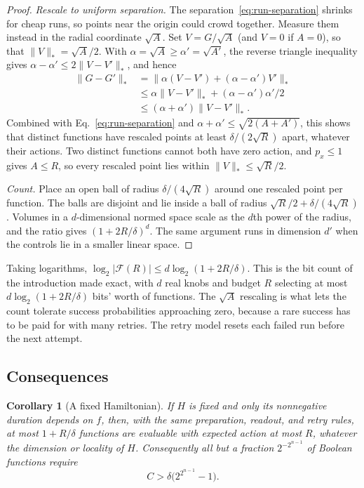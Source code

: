 \documentclass[11pt,a4paper]{article}
\newtheorem{corollary}[theorem]{Corollary}
\newcommand{\norm}[1]{\lVert #1\rVert}
\begin{document}
\begin{proof}
\emph{Rescale to uniform separation.} The separation~\eqref{eq:run-separation} shrinks for cheap runs, so points near the origin could crowd together. Measure them instead in the radial coordinate $\sqrt A$. Set $V=G/\sqrt A$ (and $V=0$ if $A=0$), so that $\norm V_*=\sqrt A/2$. With $\alpha=\sqrt A\ge\alpha'=\sqrt{A'}$, the reverse triangle inequality gives $\alpha-\alpha'\le2\norm{V-V'}_*$, and hence
\begin{equation}
 \begin{aligned}
 \norm{G-G'}_*&=\norm{\alpha(V-V')+(\alpha-\alpha')V'}_*\\
 &\le\alpha\norm{V-V'}_*+(\alpha-\alpha')\alpha'/2\\
 &\le(\alpha+\alpha')\norm{V-V'}_*.
 \end{aligned}
\end{equation}
Combined with Eq.~\eqref{eq:run-separation} and $\alpha+\alpha'\le\sqrt{2(A+A')}$, this shows that distinct functions have rescaled points at least $\delta/(2\sqrt R)$ apart, whatever their actions. Two distinct functions cannot both have zero action, and $p_x\le1$ gives $A\le R$, so every rescaled point lies within $\norm V_*\le\sqrt R/2$.

\emph{Count.} Place an open ball of radius $\delta/(4\sqrt R)$ around one rescaled point per function. The balls are disjoint and lie inside a ball of radius $\sqrt R/2+\delta/(4\sqrt R)$. Volumes in a $d$-dimensional normed space scale as the $d$th power of the radius, and the ratio gives $(1+2R/\delta)^d$. The same argument runs in dimension $d'$ when the controls lie in a smaller linear space.
\end{proof}

Taking logarithms, $\log_2|\mathcal F(R)|\le d\log_2(1+2R/\delta)$. This is the bit count of the introduction made exact, with $d$ real knobs and budget $R$ selecting at most $d\log_2(1+2R/\delta)$ bits' worth of functions. The $\sqrt A$ rescaling is what lets the count tolerate success probabilities approaching zero, because a rare success has to be paid for with many retries. The retry model resets each failed run before the next attempt.

\subsection{Consequences}

\begin{corollary}[A fixed Hamiltonian]
\label{cor:fixed}
If $H$ is fixed and only its nonnegative duration depends on $f$, then, with the same preparation, readout, and retry rules, at most $1+R/\delta$ functions are evaluable with expected action at most $R$, whatever the dimension or locality of $H$. Consequently all but a fraction $2^{-2^{n-1}}$ of Boolean functions require
\begin{equation}
 C>\delta\bigl(2^{2^{n-1}}-1\bigr) .
 \label{eq:fixedlower}
\end{equation}
\end{corollary}
\end{document}
